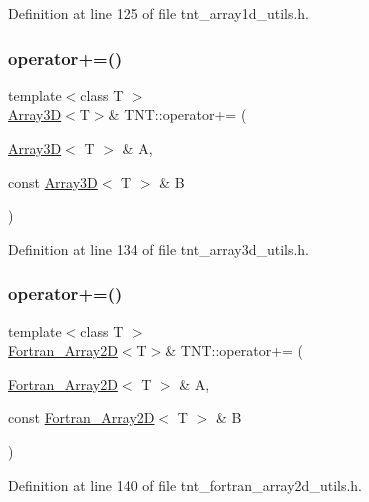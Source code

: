 Definition at line 125 of file tnt\+\_\+array1d\+\_\+utils.\+h.

\mbox{\label{namespaceTNT_abd844f41c5e4dd936c99b5a7d35e5af0}} 
\subsubsection{\texorpdfstring{operator+=()}{operator+=()}\hspace{0.1cm}{\footnotesize\ttfamily [2/5]}}
{\footnotesize\ttfamily template$<$class T $>$ \\
\hyperlink{classTNT_1_1Array3D}{Array3D}$<$T$>$\& T\+N\+T\+::operator+= (\begin{DoxyParamCaption}\item[{\hyperlink{classTNT_1_1Array3D}{Array3D}$<$ T $>$ \&}]{A,  }\item[{const \hyperlink{classTNT_1_1Array3D}{Array3D}$<$ T $>$ \&}]{B }\end{DoxyParamCaption})}



Definition at line 134 of file tnt\+\_\+array3d\+\_\+utils.\+h.

\mbox{\label{namespaceTNT_abf1054e1d50ab544cfb84d53598c4099}} 
\subsubsection{\texorpdfstring{operator+=()}{operator+=()}\hspace{0.1cm}{\footnotesize\ttfamily [3/5]}}
{\footnotesize\ttfamily template$<$class T $>$ \\
\hyperlink{classTNT_1_1Fortran__Array2D}{Fortran\+\_\+\+Array2D}$<$T$>$\& T\+N\+T\+::operator+= (\begin{DoxyParamCaption}\item[{\hyperlink{classTNT_1_1Fortran__Array2D}{Fortran\+\_\+\+Array2D}$<$ T $>$ \&}]{A,  }\item[{const \hyperlink{classTNT_1_1Fortran__Array2D}{Fortran\+\_\+\+Array2D}$<$ T $>$ \&}]{B }\end{DoxyParamCaption})}



Definition at line 140 of file tnt\+\_\+fortran\+\_\+array2d\+\_\+utils.\+h.

